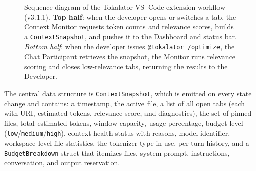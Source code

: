 \documentclass[a4paper,fleqn]{cas-dc}
\begin{document}
\begin{figure}[htp!]
\caption{Sequence diagram of the Tokalator VS~Code extension workflow (v3.1.1). \textbf{Top half}: when the developer opens or switches a tab, the Context Monitor requests token counts and relevance scores, builds a \texttt{ContextSnapshot}, and pushes it to the Dashboard and status bar. \textit{Bottom half}: when the developer issues \texttt{@tokalator /optimize}, the Chat Participant retrieves the snapshot, the Monitor runs relevance scoring and closes low-relevance tabs, returning the results to the Developer.}
\label{fig:seq}
\end{figure}

The central data structure is \texttt{ContextSnapshot}, which is emitted on every state change and contains: a timestamp, the active file, a list of all open tabs (each with URI, estimated tokens, relevance score, and diagnostics), the set of pinned files, total estimated tokens, window capacity, usage percentage, budget level (\texttt{low}/\texttt{medium}/\texttt{high}), context health status with reasons, model identifier, workspace-level file statistics, the tokenizer type in use, per-turn history, and a \texttt{BudgetBreakdown} struct that itemizes files, system prompt, instructions, conversation, and output reservation.




\end{document}
